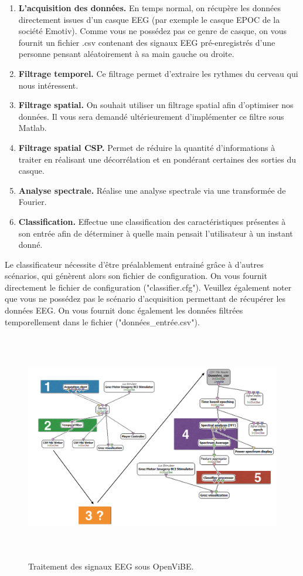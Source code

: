\begin{enumerate}
	\item \textbf{L'acquisition des données.} En temps normal, on récupère les données directement issues d'un casque EEG (par exemple le casque EPOC de la société Emotiv). Comme vous ne possédez pas ce genre de casque, on vous fournit un fichier .csv contenant des signaux EEG pré-enregistrés d'une personne pensant aléatoirement à sa main gauche ou droite.
	\smallbreak
	\item \textbf{Filtrage temporel.} Ce filtrage permet d'extraire les rythmes du cerveau qui nous intéressent.
	\smallbreak
	\item \textbf{Filtrage spatial.} On souhait utiliser un filtrage spatial afin d'optimiser nos données. Il vous sera demandé ultérieurement d'implémenter ce filtre sous Matlab. 
	\item \textbf{Filtrage spatial CSP.} Permet de réduire la quantité d'informations à traiter en réalisant une décorrélation et en pondérant certaines des sorties du casque. 
	\smallbreak
	\item \textbf{Analyse spectrale.} Réalise une analyse spectrale via une transformée de Fourier.
	\smallbreak
	\item \textbf{Classification.} Effectue une classification des caractéristiques présentes à son entrée afin de déterminer à quelle main pensait l'utilisateur à un instant donné. 
\end{enumerate}

Le classificateur nécessite d'être préalablement entrainé grâce à d'autres scénarios, qui génèrent alors son fichier de configuration. On vous fournit directement le fichier de configuration ("classifier.cfg"). Veuillez également noter que vous ne possédez pas le scénario d'acquisition permettant de récupérer les données EEG. On vous fournit donc également les données filtrées temporellement dans le fichier ("données\_entrée.csv").

\begin{figure}[h]
	\centering\includegraphics[height=10cm]{images/sujet_signal_color.png}
	\caption{Traitement des signaux EEG sous OpenViBE.}
	\label{fig:interface_travail_ov_5}
\end{figure}

